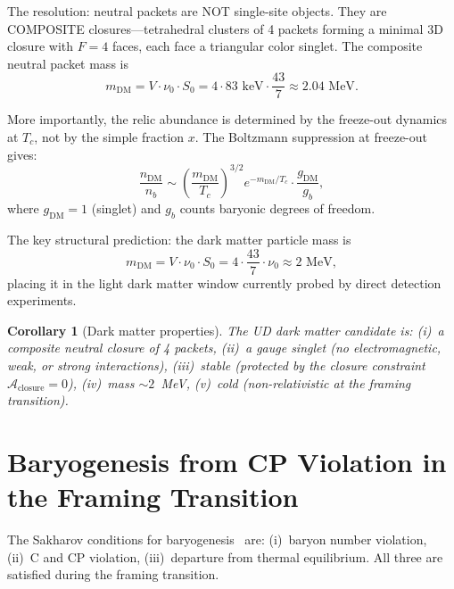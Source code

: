 \documentclass[11pt,twocolumn]{article}
\newtheorem{corollary}{Corollary}
\begin{document}
The resolution: neutral packets are NOT single-site objects.
They are COMPOSITE closures---tetrahedral clusters of 4 packets forming a minimal 3D closure with $F=4$ faces, each face a triangular color singlet.
The composite neutral packet mass is
\begin{equation}
m_{\mathrm{DM}} = V\cdot\nu_0\cdot S_0 = 4\cdot 83\text{ keV}\cdot\frac{43}{7}\approx 2.04\text{ MeV}.
\end{equation}

More importantly, the relic abundance is determined by the freeze-out dynamics at $T_c$, not by the simple fraction $x$.
The Boltzmann suppression at freeze-out gives:
\begin{equation}
\frac{n_{\mathrm{DM}}}{n_b}\sim\left(\frac{m_{\mathrm{DM}}}{T_c}\right)^{3/2}e^{-m_{\mathrm{DM}}/T_c}\cdot\frac{g_{\mathrm{DM}}}{g_b},
\end{equation}
where $g_{\mathrm{DM}}=1$ (singlet) and $g_b$ counts baryonic degrees of freedom.

The key structural prediction: the dark matter particle mass is
\begin{equation}
m_{\mathrm{DM}} = V\cdot\nu_0\cdot S_0 = 4\cdot\frac{43}{7}\cdot\nu_0\approx 2\text{ MeV},
\end{equation}
placing it in the light dark matter window currently probed by direct detection experiments.

\begin{corollary}[Dark matter properties]
The UD dark matter candidate is:
(i)~a composite neutral closure of 4 packets,
(ii)~a gauge singlet (no electromagnetic, weak, or strong interactions),
(iii)~stable (protected by the closure constraint $\mathcal{A}_{\mathrm{closure}}=0$),
(iv)~mass $\sim 2$~MeV,
(v)~cold (non-relativistic at the framing transition).
\end{corollary}

\section{Baryogenesis from CP Violation in the Framing Transition}
\label{sec:baryo}

The Sakharov conditions for baryogenesis~\cite{sakharov1967} are:
(i)~baryon number violation,
(ii)~C and CP violation,
(iii)~departure from thermal equilibrium.
All three are satisfied during the framing transition.
\end{document}
